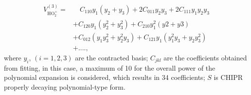 \documentclass[12pt]{article}
\begin{document}
\begin{equation}
    \begin{split}
        V_{\text{HO}^+_2}^{(3)} = 
        &\quad C_{110}y_1(y_2+y_3) +
        2C_{011}y_2y_3 +
        2C_{111}y_1y_2y_3  \\
        &+ C_{120}y_1(y_2^2 + y_3^2) + C_{210}y_1^2(y2+y3) \\
        &+ C_{012}(y_1y_3^2 + y_2^2y_3) 
        + C_{121}y_1(y_1^2y_3 
        + y_2y_3^2) \\
        &+ ....,
    \end{split}
\label{eq2x23body}
\end{equation}
where $y_i$, $(i=1,2,3)$ are the contracted basis; $C_{jkl}$ are the coefficients obtained from fitting, in this case, a maximum of 10 for the overall power of the polynomial expansion is considered, which results in 34 coefficients; $S$ is CHIPR properly decaying polynomial-type form. 

\end{document}

